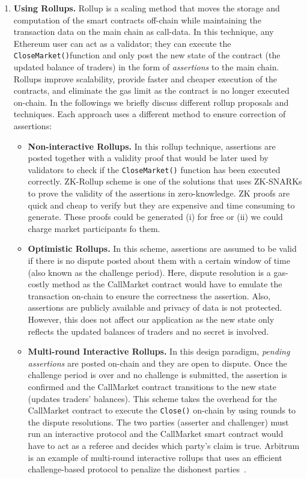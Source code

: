 \begin{enumerate}

\item \textbf{Using Rollups.} Rollup is a scaling method that moves the storage and computation of the smart contracts off-chain while maintaining the transaction data on the main chain as call-data. In this technique, any Ethereum user can act as a validator; they can execute the \texttt{CloseMarket()}function and only post the new state of the contract (the updated balance of traders) in the form of \textit{assertions} to the main chain. Rollups improve scalability, provide faster and cheaper execution of the contracts, and eliminate the gas limit as the contract is no longer executed on-chain.
In the followings we briefly discuss different rollup proposals and techniques. Each approach uses a different method to ensure correction of assertions:


\begin{itemize}

\item \textbf{{Non-interactive Rollups.}} In this rollup technique, assertions are posted together with a validity proof that would be later used by validators to check if the \texttt{CloseMarket()} function has been executed correctly. ZK-Rollup scheme is one of the solutions that uses ZK-SNARKs to prove the validity of the assertions in zero-knowledge. ZK proofs are quick and cheap to verify but they are expensive and time consuming to generate. These proofs could be generated (i) for free or (ii) we could charge market participants fo them.

\item \textbf{{Optimistic Rollups.}} In this scheme, assertions are assumed to be valid if there is no dispute posted about them with a certain window of time (also known as the challenge period). Here, dispute resolution is a gas-costly method as the CallMarket contract would have to emulate the transaction on-chain to ensure the correctness the assertion. Also, assertions are publicly available and privacy of data is not protected. However, this does not affect our application as the new state only reflects the updated balances of traders and no secret is involved.

\item \textbf {{Multi-round Interactive Rollups.}} In this design paradigm, \textit{pending assertions} are posted on-chain and they are open to dispute. Once the challenge period is over and no challenge is submitted, the assertion is confirmed and the CallMarket contract transitions to the new state (\ie updates traders' balances). This scheme takes the overhead for the CallMarket contract to execute the \texttt{Close()} on-chain by using rounds to the dispute resolutions. The two parties (asserter and challenger) must run an interactive protocol and the CallMarket smart contract would have to act as a referee and decides which party's claim is true. Arbitrum is an example of multi-round interactive rollups that uses an efficient challenge-based protocol to penalize the dishonest parties~\cite{kalodner2018arbitrum}. 


\end{itemize}
\end{enumerate}
